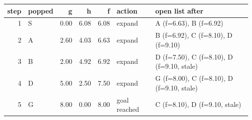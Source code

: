 \begin{tabular}{rlrrrll}
\toprule
step & popped & g & h & f & action & open list after \\
\midrule
1 & S & 0.00 & 6.08 & 6.08 & expand & A (f=6.63), B (f=6.92) \\
2 & A & 2.60 & 4.03 & 6.63 & expand & B (f=6.92), C (f=8.10), D (f=9.10) \\
3 & B & 2.00 & 4.92 & 6.92 & expand & D (f=7.50), C (f=8.10), D (f=9.10, stale) \\
4 & D & 5.00 & 2.50 & 7.50 & expand & G (f=8.00), C (f=8.10), D (f=9.10, stale) \\
5 & G & 8.00 & 0.00 & 8.00 & goal reached & C (f=8.10), D (f=9.10, stale) \\
\bottomrule
\end{tabular}
